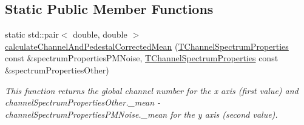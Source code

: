 \subsection*{Static Public Member Functions}
\begin{DoxyCompactItemize}
\item 
static std::pair$<$ double, double $>$ \hyperlink{class_run_comparator_a7e9217ea3aff2f7f2b94760b8df8884a}{calculateChannelAndPedestalCorrectedMean} (\hyperlink{class_t_channel_spectrum_properties}{TChannelSpectrumProperties} const \&spectrumPropertiesPMNoise, \hyperlink{class_t_channel_spectrum_properties}{TChannelSpectrumProperties} const \&spectrumPropertiesOther)
\begin{DoxyCompactList}\small\item\em This function returns the global channel number for the x axis (first value) and {\ttfamily channelSpectrumPropertiesOther.\_\-mean} -\/ {\ttfamily channelSpectrumPropertiesPMNoise.\_\-mean} for the y axis (second value). \item\end{DoxyCompactList}\end{DoxyCompactItemize}
